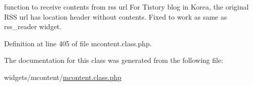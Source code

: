function to receive contents from rss url For Tistory blog in Korea, the original R\+SS url has location header without contents. Fixed to work as same as rss\+\_\+reader widget. 



Definition at line 405 of file mcontent.\+class.\+php.



The documentation for this class was generated from the following file\+:\begin{DoxyCompactItemize}
\item 
widgets/mcontent/\hyperlink{mcontent_8class_8php}{mcontent.\+class.\+php}\end{DoxyCompactItemize}
